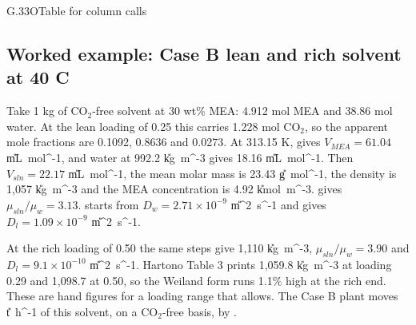 \begin{eqcard}{G.33}{O}{Table for column calls}
\end{eqcard}

\subsection*{Worked example: Case B lean and rich solvent at 40 C}
Take 1 kg of CO$_2$-free solvent at 30 wt\% MEA: 4.912 mol MEA and 38.86 mol water. At the lean loading of 0.25 this carries 1.228 mol CO$_2$, so the apparent mole fractions are 0.1092, 0.8636 and 0.0273. At 313.15 K,  gives $V_{MEA}=61.04$ \U{mL\ mol^{-1}}, and water at 992.2 \U{kg\ m^{-3}} gives 18.16 \U{mL\ mol^{-1}}. Then $V_{sln}=22.17$ \U{mL\ mol^{-1}}, the mean molar mass is 23.43 \U{g\ mol^{-1}}, the density is 1,057 \U{kg\ m^{-3}} and the MEA concentration is 4.92 \U{kmol\ m^{-3}}.  gives $\mu_{sln}/\mu_w=3.13$.  starts from $D_w=2.71\times10^{-9}$ \U{m^2\ s^{-1}} and gives $D_l=1.09\times10^{-9}$ \U{m^2\ s^{-1}}.

At the rich loading of 0.50 the same steps give 1,110 \U{kg\ m^{-3}}, $\mu_{sln}/\mu_w=3.90$ and $D_l=9.1\times10^{-10}$ \U{m^2\ s^{-1}}. Hartono Table 3 prints 1,059.8 \U{kg\ m^{-3}} at loading 0.29 and 1,098.7 at 0.50, so the Weiland form runs 1.1\% high at the rich end. These are hand figures for a loading range that  allows. The Case B plant moves \vMsolvB{} \U{t\ h^{-1}} of this solvent, on a CO$_2$-free basis, by .

